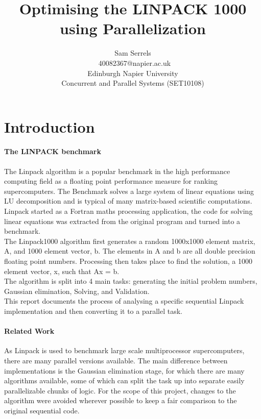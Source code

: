 \documentclass[conference]{acmsiggraph}
\title{Optimising the LINPACK 1000 using Parallelization}
\author{Sam Serrels\\\ 40082367@napier.ac.uk \\
Edinburgh Napier University\\
Concurrent and Parallel Systems (SET10108)}
\begin{document}
\maketitle

\section{Introduction}

\paragraph{The LINPACK benchmark}
The Linpack algorithm is a popular benchmark in the high performance computing field as a floating point performance measure for ranking supercomputers.
The Benchmark solves a large system of linear equations using LU decomposition and is typical of many matrix-based scientific computations.
Linpack started as a Fortran maths processing application, the code for solving linear equations was extracted from the original program and turned into a benchmark.  
\cite{Dongarra03thelinpack}
\\
The Linpack1000 algorithm first generates a random 1000x1000 element matrix, A, and 1000 element vector, b. The elements in A and b are all double precision floating point numbers. 
Processing then takes place to find the solution, a 1000 element vector, x, such that Ax = b.
\\
The algorithm is split into 4 main tasks: generating the initial problem numbers, Gaussian elimination, Solving, and Validation.
\\
This report documents the process of analysing a specific sequential Linpack implementation and then converting it to a parallel task.

\paragraph{Related Work}
As Linpack is used to benchmark large scale multiprocessor supercomputers, there are many parallel versions available. 
The main difference between implementations is the Gaussian elimination stage, for which there are many algorithms available, some of which can split the task up into separate easily parallelizable chunks of logic. For the scope of this project, changes to the algorithm were avoided wherever possible to keep a fair comparison to the original sequential code.
\end{document}
